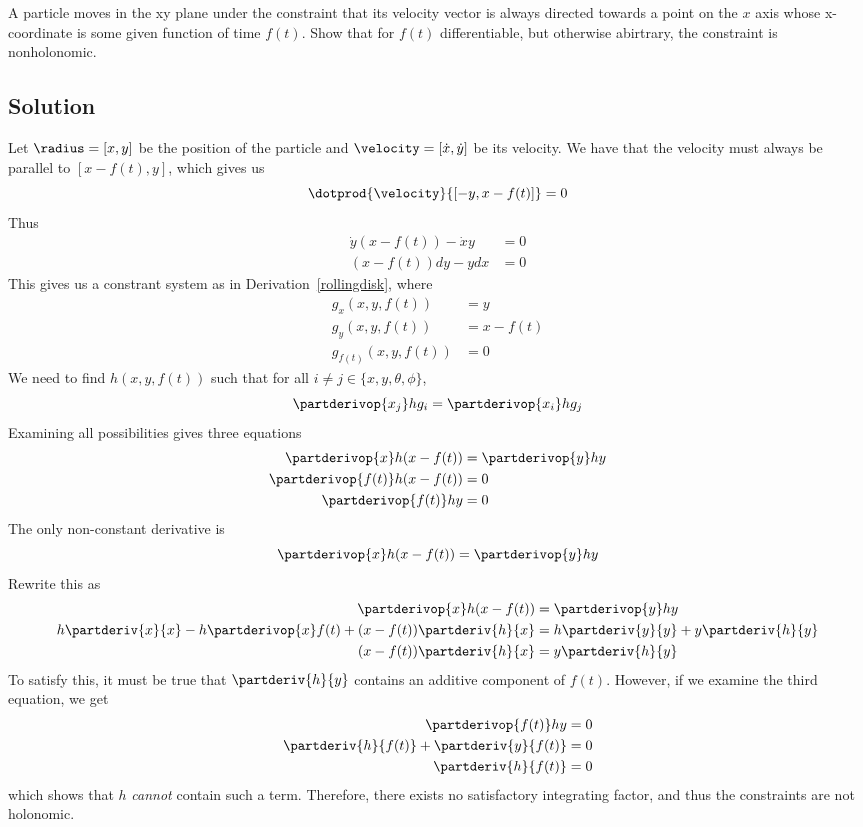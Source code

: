 A particle moves in the xy plane under the constraint that its velocity
vector is always directed towards a point on the $x$ axis whose
x-coordinate is some given function of time $f(t)$.  Show that for
$f(t)$ differentiable, but otherwise abirtrary, the constraint is
nonholonomic.

\subsection*{Solution}

Let $\radius = [x, y]$ be the position of the particle and $\velocity
= [\dot{x}, \dot{y}]$ be its velocity. We have that the velocity must
always be parallel to $[x - f(t), y]$, which gives us
\[ \dotprod{\velocity}{[-y, x - f(t)]} = 0 \]
Thus
\begin{align*}
\dot{y}(x - f(t)) - \dot{x}y &= 0 \\
(x - f(t))dy - ydx &= 0
\end{align*}
This gives us a constrant system as in Derivation~\ref{rollingdisk}, where
\begin{align*}
  g_x(x, y, f(t)) &= y \\
  g_y(x, y, f(t)) &= x - f(t) \\
  g_{f(t)}(x, y, f(t)) &= 0
\end{align*}
We need to find $h(x, y, f(t))$ such that for all $i \neq j \in \{x,
y, \theta, \phi\}$,
\[\partderivop{x_j}hg_i = \partderivop{x_i}hg_j\]
Examining all possibilities gives three equations
\begin{align*}
  \partderivop{x}h(x - f(t)) &= \partderivop{y}hy \\
  \partderivop{f(t)}h(x - f(t)) &= 0 \\
  \partderivop{f(t)}hy &= 0 \\
\end{align*}
The only non-constant derivative is
\[\partderivop{x}h(x - f(t)) = \partderivop{y}hy\]
Rewrite this as
\begin{align*}
  \partderivop{x}h(x - f(t))
  &=
  \partderivop{y}hy \\
  h\partderiv{x}{x} - h\partderivop{x}f(t) + (x - f(t))\partderiv{h}{x}
  &=
  h\partderiv{y}{y} + y\partderiv{h}{y} \\
  (x - f(t))\partderiv{h}{x}
  &=
  y\partderiv{h}{y}
\end{align*}
To satisfy this, it must be true that $\partderiv{h}{y}$ contains an
additive component of $f(t)$.  However, if we examine the third
equation, we get
\begin{align*}
  \partderivop{f(t)}hy &= 0 \\
  \partderiv{h}{f(t)} + \partderiv{y}{f(t)} &= 0 \\
  \partderiv{h}{f(t)} &= 0
\end{align*}
which shows that $h$ \emph{cannot} contain such a term.  Therefore,
there exists no satisfactory integrating factor, and thus the
constraints are not holonomic.
